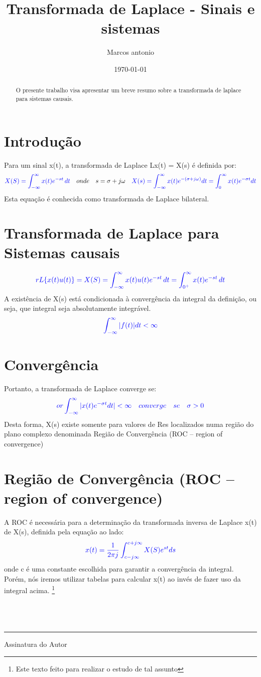 \documentclass[12pt]{article}
\author{Marcos antonio}
\title{Transformada de Laplace - Sinais e sistemas}
\date{\today}
\begin{document}
\maketitle
\begin{abstract}
    O presente trabalho visa apresentar um breve resumo sobre a transformada de laplace para sistemas causais. 
\end{abstract}
\tableofcontents

\section{Introdução}
Para um sinal x(t), a transformada de Laplace L{x(t)} = X(s) é definida por:
\[\textcolor{blue}{X(S) = \int_{-\infty}^{\infty} x(t)e^{-st}   \, dt}\quad onde\quad s=\sigma +j\omega 
\quad \textcolor{blue}{X(s)= \int_{-\infty}^{\infty}x(t)e^{-(\sigma +j\omega)}dt = \int_{0}^{\infty}x(t)e^{-\sigma t}dt}\] Esta equação é conhecida como transformada de Laplace bilateral.
\section{Transformada de Laplace para Sistemas causais}
\[\textcolor{blue}{rL\{x(t)u(t)\} = X(S)= \int_{-\infty}^{\infty} x(t)u(t)e^{-st} \, dt = \int_{0^{+}}^{\infty} x(t)e^{-st}  \, dt}\]A existência de X(s) está condicionada à convergência da integral da definição, ou seja, que integral seja absolutamente integrável.
\[\textcolor{blue}{ \int_{-\infty}^{\infty} |f(t)| dt < \infty }\]
\section{Convergência}
Portanto, a transformada de Laplace converge se:
\[\textcolor{blue}{or\int_{-\infty}^{\infty} |x(t)e^{-\sigma t}dt| <{\infty} \quad converge\quad se\quad \sigma > 0 }\]
Desta forma, X(s) existe somente para valores de Re{s} localizados numa região do plano complexo denominada Região de Convergência (ROC – region of convergence)
\section{Região de Convergência (ROC – region of convergence)}
A ROC é necessária para a determinação da transformada inversa de Laplace x(t) de X(s), definida pela equação ao lado:
\[\textcolor{blue}{x(t) =\frac{1}{2\pi j} \int_{c-j\infty}^{c +j\infty} X(S)e^{st}ds}\]
onde c é uma constante escolhida para garantir a convergência da integral. Porém, nós iremos utilizar tabelas para calcular x(t) ao invés de fazer uso da integral acima.
\footnote{Este texto feito para realizar o estudo de tal assunto}\\\\\\\\



\begin{minipage}{0.4\textwidth}
    \centering
    \hrule
    Assinatura do Autor
\end{minipage}
\end{document}
